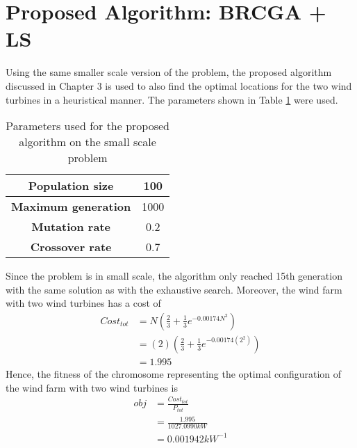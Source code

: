  \section{Proposed Algorithm: BRCGA + LS}
    Using the same smaller scale version of the problem, the proposed algorithm discussed in Chapter 3 is used to also find the optimal locations for the two wind turbines in a heuristical manner. The parameters shown in Table \ref{parametersGA} were used.
    
    \begin{table}[H]
        \centering
        \begin{tabular}{|c|c|} \hline
            \textbf{Population size} &100 \\ \hline
            \textbf{Maximum generation} &1000 \\ \hline
            \textbf{Mutation rate} &0.2 \\ \hline
            \textbf{Crossover rate} &0.7 \\
            \hline
        \end{tabular}
        \caption{Parameters used for the proposed algorithm on the small scale problem}
        \label{parametersGA}
    \end{table}
    
    Since the problem is in small scale, the algorithm only reached 15th generation with the same solution as with the exhaustive search. Moreover, the wind farm with two wind turbines has a cost of
    \begin{align*}
        Cost_{tot}
        &= N\left(\frac{2}{3} + \frac{1}{3}e^{-0.00174N^2}\right) \\
        &= \left(2\right)\left(\frac{2}{3} + \frac{1}{3}e^{-0.00174\left(2^2\right)}\right) \\
        &= 1.995
    \end{align*}
    Hence, the fitness of the chromosome representing the optimal configuration of the wind farm with two wind turbines is
    \begin{align*}
        obj
        &=\frac{Cost_{tot}}{P_{tot}} \\
        &=\frac{1.995}{1027.0990kW} \\
        &=0.001942kW^{-1}
    \end{align*}